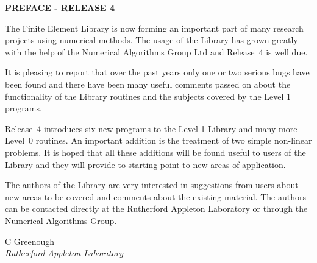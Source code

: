 \centerline{\bf PREFACE - RELEASE 4} 
\vspace*{5mm}

The Finite Element Library is now forming an important part of many
research projects using numerical methods. The usage of the Library
has grown greatly with the help of the Numerical Algorithms Group Ltd
and Release~4 is well due.

It is pleasing to report that over the past years only one or two serious
bugs have been found and there have been many useful comments passed on
about the functionality of the Library routines and the subjects covered 
by the Level 1 programs.

Release~4 introduces six new programs to the Level 1 Library and many more
Level~0 routines. An important addition is the treatment of two simple
non-linear problems. It is hoped that all these additions will be found
useful to users of the Library and they will provide to starting point
to new areas of application.

The authors of the Library are very interested in suggestions from
users about new areas to be covered and comments about the existing 
material.
The authors can be contacted directly at the Rutherford Appleton 
Laboratory
or through the Numerical Algorithms Group.

\vspace*{5mm}
\noindent
{C Greenough\\
\it Rutherford Appleton Laboratory}
